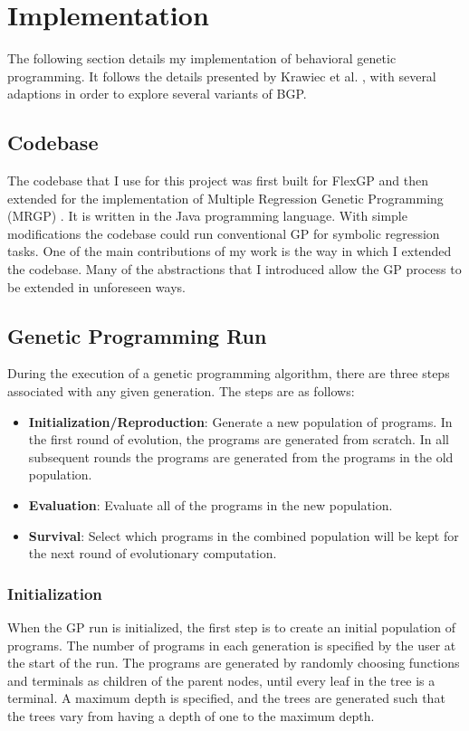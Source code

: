 \chapter{Implementation}
\label{chap:implementation}

The following section details my implementation of behavioral genetic programming.  It follows the details  presented by Krawiec et al. \cite{krawiec}, with several adaptions in order to explore several variants of BGP.

\section{Codebase}
The codebase that I use for this project was first built for FlexGP \cite{flexgp} and then extended for the implementation of Multiple Regression Genetic Programming (MRGP) \cite{mrgp}.  It is written in the Java programming language.  With simple modifications the codebase could run conventional GP for symbolic regression tasks.  One of the main contributions of my work is the way in which I extended the codebase.  Many of the abstractions that I introduced allow the GP process to be extended in unforeseen ways.

\section{Genetic Programming Run}
During the execution of a genetic programming algorithm, there are three steps associated with any given generation.  The steps are as follows:

\begin{itemize}[noitemsep]
\item \textbf{Initialization/Reproduction}: Generate a new population of programs.  In the first round of evolution, the programs are generated from scratch.  In all subsequent rounds the programs are generated from the programs in the old population.
\item \textbf{Evaluation}: Evaluate all of the programs in the new population.
\item \textbf{Survival}: Select which programs in the combined population will be kept for the next round of evolutionary computation.
\end{itemize}

\subsection{Initialization}
When the GP run is initialized, the first step is to create an initial population of programs.  The number of programs in each generation is specified by the user at the start of the run.  The programs are generated by randomly choosing functions and terminals as children of the parent nodes, until every leaf in the tree is a terminal.  A maximum depth is specified, and the trees are generated such that the trees vary from having a depth of one to the maximum depth.

